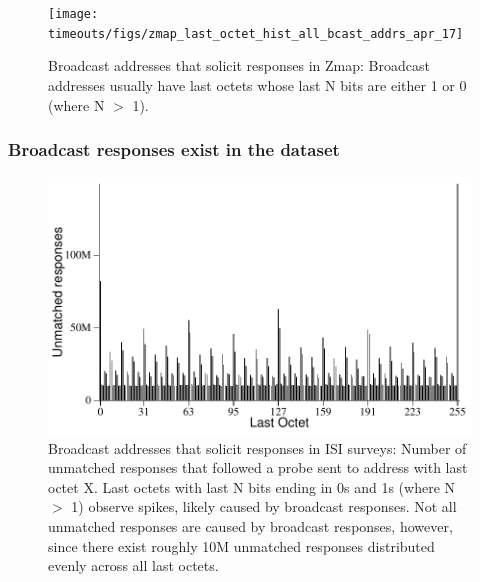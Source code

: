 \begin{figure}[t]
\begin{center}
\texttt{[image: timeouts/figs/zmap\_last\_octet\_hist\_all\_bcast\_addrs\_apr\_17]}
\end{center}
\caption[Broadcast addresses that solicit responses in Zmap scans]{\label{fig:zmap_last_octet_hist}%
Broadcast addresses that solicit responses in Zmap: Broadcast addresses usually
have last octets whose last N bits are either 1 or 0
(where N $>$ 1).
}
\end{figure}


\subsubsection*{Broadcast responses exist in the dataset}

%
\begin{figure}[t]
\begin{center}
\includegraphics[width=.99\linewidth]{timeouts/figs/last_octet_hist}
\end{center}
\caption[Broadcast addresses that solicit responses in ISI surveys]{\label{fig:bcast_hist}%
Broadcast addresses that solicit responses in ISI surveys: Number of unmatched responses that followed a probe sent to address
with last octet X. Last octets with last N bits ending in
0s and 1s (where N $>$ 1) observe spikes, likely caused by broadcast
responses. Not all unmatched responses are caused by broadcast
responses, however, since there exist roughly 10M unmatched
responses distributed evenly across all last octets.}
\end{figure}



